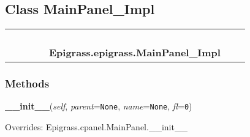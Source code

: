 
\subsection{Class MainPanel\_Impl}

    \label{Epigrass:epigrass:MainPanel_Impl}
\begin{tabular}{cccccccc}
\multicolumn{2}{r}{\settowidth{\BCL}{??-5}\multirow{2}{\BCL}{??-5}}
&&
&&
  \\\cline{3-3}
  &&\multicolumn{1}{c|}{}
&&
&&
  \\
\multicolumn{4}{r}{\settowidth{\BCL}{Epigrass.cpanel.MainPanel}\multirow{2}{\BCL}{Epigrass.cpanel.MainPanel}}
&&
  \\\cline{5-5}
  &&&&\multicolumn{1}{c|}{}
&&
  \\
&&&&\multicolumn{2}{l}{\textbf{Epigrass.epigrass.MainPanel\_Impl}}
\end{tabular}



  \subsubsection{Methods}

    \vspace{0.5ex}

    \begin{boxedminipage}{\textwidth}

    \raggedright \textbf{\_\_init\_\_}(\textit{self}, \textit{parent}=\texttt{None}, \textit{name}=\texttt{None}, \textit{fl}=\texttt{0})

      Overrides: Epigrass.cpanel.MainPanel.\_\_init\_\_

    \end{boxedminipage}

    \label{Epigrass:epigrass:MainPanel_Impl:initRc}

